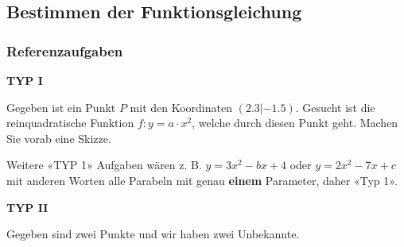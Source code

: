 \newpage

\subsection{Bestimmen der Funktionsgleichung}

\subsubsection{Referenzaufgaben}

\textbf{TYP I}

Gegeben ist ein Punkt $P$ mit den Koordinaten $(2.3 | -1.5)$. Gesucht ist die reinquadratische Funktion $f: y=a\cdot{}x^2$, welche durch diesen Punkt geht.
Machen Sie vorab eine Skizze.




Weitere «TYP 1» Aufgaben wären z. B. $y = 3x^2 - bx + 4$ oder $y=2x^2
-7x + c$ mit anderen Worten alle Parabeln mit genau \textbf{einem}
Parameter, daher «Typ 1».

\newpage



\textbf{TYP II}

Gegeben sind zwei Punkte und wir haben zwei Unbekannte.

